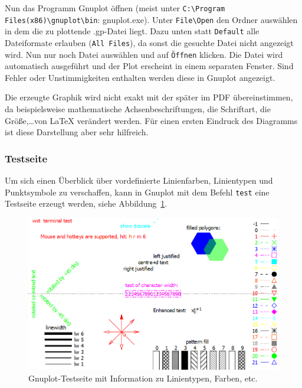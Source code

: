 Nun das Programm Gnuplot öffnen (meist unter
\verb+C:\Program Files(x86)\gnuplot\bin+: gnuplot.exe). Unter \verb+File\Open+
den Ordner auswählen in dem die zu plottende .gp-Datei liegt. Dazu unten statt
\verb+Default+ alle Dateiformate erlauben (\verb+All Files+), da sonst
die gesuchte Datei nicht angezeigt wird. Nun nur noch Datei auswählen und auf \verb+Öffnen+ klicken.
Die Datei wird automatisch ausgeführt und der Plot erscheint in einem separaten
Fenster.
Sind Fehler oder Unstimmigkeiten enthalten werden diese in Gnuplot angezeigt.

Die erzeugte Graphik wird nicht exakt mit der später im PDF übereinstimmen, da
beispielsweise mathematische Achsenbeschriftungen, die Schriftart, die
Größe,\ldots von LaTeX verändert werden. Für einen ersten Eindruck des Diagramms
ist diese Darstellung aber sehr hilfreich.


\subsubsection{Testseite}

Um sich einen Überblick über vordefinierte Linienfarben, Linientypen und
Punktsymbole zu verschaffen, kann in Gnuplot mit dem Befehl \verb+test+ eine
Testseite erzeugt werden, siehe Abbildung~\ref{fig:Testseite}.
 \begin{figure}[t]
    \begin{center}\small
    \includegraphics[width=1.0\textwidth]{02_beispiel_kapitel/Testseite.PNG}
    \caption{Gnuplot-Testseite mit Information zu Linientypen, Farben, etc.}
    \label{fig:Testseite}
  \end{center}
 \end{figure}


